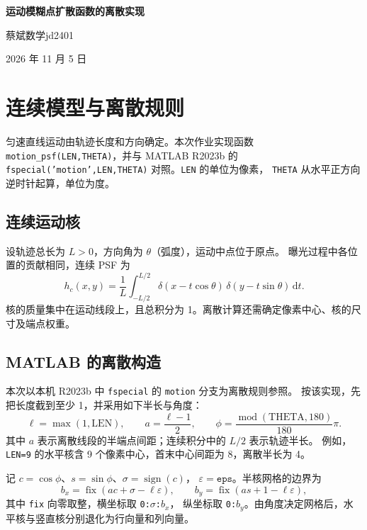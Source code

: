 \documentclass[UTF8,12pt,a4paper]{ctexart}
\begin{document}
\begin{center}
{\LARGE\bfseries 运动模糊点扩散函数的离散实现}\par\vspace{9pt}
蔡斌\quad 数学jd2401\par\vspace{3pt}
2026 年 11 月 5 日
\end{center}

\section{连续模型与离散规则}
匀速直线运动由轨迹长度和方向确定。本次作业实现函数
\texttt{motion\_psf(LEN,THETA)}，并与 MATLAB R2023b 的
\texttt{fspecial('motion',LEN,THETA)} 对照。\texttt{LEN} 的单位为像素，
\texttt{THETA} 从水平正方向逆时针起算，单位为度\cite{doc}。

\subsection{连续运动核}
设轨迹总长为 $L>0$，方向角为 $\theta$（弧度），运动中点位于原点。
曝光过程中各位置的贡献相同，连续 PSF 为
\begin{equation}
 h_c(x,y)=\frac{1}{L}\int_{-L/2}^{L/2}
 \delta(x-t\cos\theta)\,\delta(y-t\sin\theta)\,\mathrm dt.
\end{equation}
核的质量集中在运动线段上，且总积分为 1。离散计算还需确定像素中心、核的尺寸及端点权重。

\subsection{MATLAB 的离散构造}
本次以本机 R2023b 中 \texttt{fspecial} 的 \texttt{motion} 分支为离散规则参照\cite{local}。
按该实现，先把长度截到至少 1，并采用如下半长与角度：
\begin{equation}
 \ell=\max(1,\mathrm{LEN}),\qquad a=\frac{\ell-1}{2},\qquad
 \phi=\frac{\operatorname{mod}(\mathrm{THETA},180)}{180}\pi.
\end{equation}
其中 $a$ 表示离散线段的半端点间距；连续积分中的 $L/2$ 表示轨迹半长。
例如，\texttt{LEN=9} 的水平核含 9 个像素中心，首末中心间距为 8，离散半长为 4。

记 $c=\cos\phi$、$s=\sin\phi$、$\sigma=\operatorname{sign}(c)$，
$\varepsilon=\texttt{eps}$。半核网格的边界为
\begin{equation}
 b_x=\operatorname{fix}(ac+\sigma-\ell\varepsilon),\qquad
 b_y=\operatorname{fix}(as+1-\ell\varepsilon),
\end{equation}
其中 \texttt{fix} 向零取整，横坐标取 \texttt{0:}$\sigma$\texttt{:}$b_x$，
纵坐标取 \texttt{0:}$b_y$。由角度决定网格后，水平核与竖直核分别退化为行向量和列向量。
\end{document}
